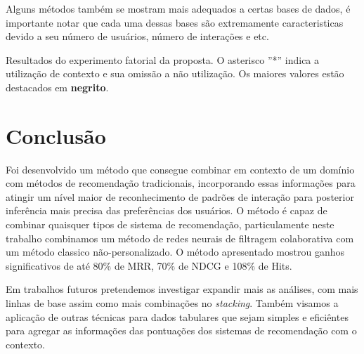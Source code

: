 \documentclass[sigconf]{acmart}
\begin{document}
Alguns métodos também se mostram mais adequados a certas bases de dados, é importante notar que cada uma dessas bases são extremamente caracteristicas devido a seu número de usuários, número de interações e etc.

\begin{table}
\small

\caption{\small Resultados do experimento fatorial da proposta. O asterisco ''*'' indica a utilização de contexto e sua omissão a não utilização. Os maiores valores estão destacados em \textbf{negrito}.}
\label{tbl:resultsfact}
\end{table}


\section{Conclusão}

Foi desenvolvido um método que consegue combinar em contexto de um domínio com métodos de recomendação tradicionais, incorporando essas informações para atingir um nível maior de reconhecimento de padrões de interação para posterior inferência mais precisa das preferências dos usuários. O método é capaz de combinar quaisquer tipos de sistema de recomendação, particulamente neste trabalho combinamos um método de redes neurais de filtragem colaborativa com um método classico não-personalizado. O método apresentado mostrou ganhos significativos de até 80\% de MRR, 70\% de NDCG e 108\% de Hits.

Em trabalhos futuros pretendemos investigar expandir mais as análises, com mais linhas de base assim como mais combinações no \textit{stacking}. Também visamos a aplicação de outras técnicas para dados tabulares que sejam simples e eficiêntes para agregar as informações das pontuações dos sistemas de recomendação com o contexto.




\end{document}

